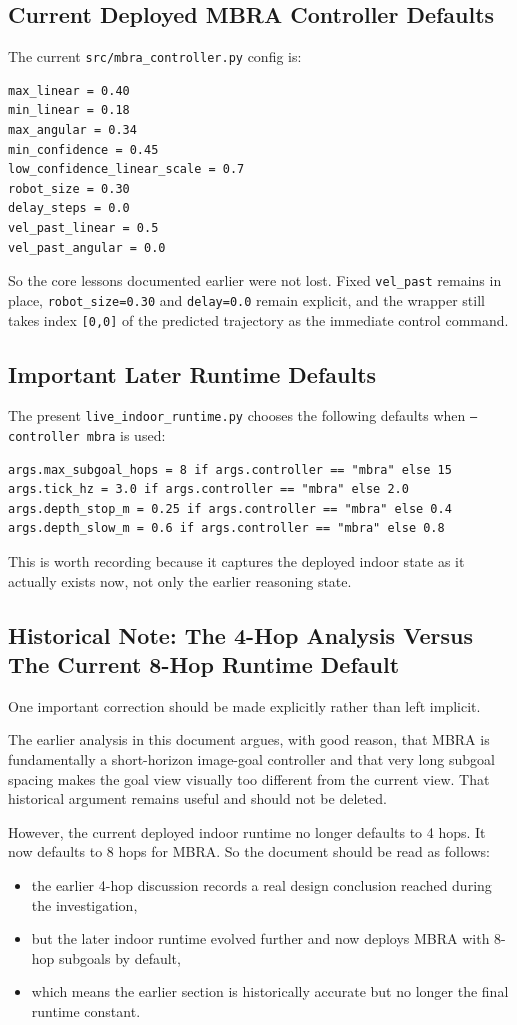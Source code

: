 \documentclass[11pt,a4paper]{article}
\begin{document}
\subsection{Current Deployed MBRA Controller Defaults}
The current \texttt{src/mbra\_controller.py} config is:
\begin{verbatim}
max_linear = 0.40
min_linear = 0.18
max_angular = 0.34
min_confidence = 0.45
low_confidence_linear_scale = 0.7
robot_size = 0.30
delay_steps = 0.0
vel_past_linear = 0.5
vel_past_angular = 0.0
\end{verbatim}

So the core lessons documented earlier were not lost. Fixed \texttt{vel\_past} remains in place, \texttt{robot\_size=0.30} and \texttt{delay=0.0} remain explicit, and the wrapper still takes index \texttt{[0,0]} of the predicted trajectory as the immediate control command.

\subsection{Important Later Runtime Defaults}
The present \texttt{live\_indoor\_runtime.py} chooses the following defaults when \texttt{--controller mbra} is used:
\begin{verbatim}
args.max_subgoal_hops = 8 if args.controller == "mbra" else 15
args.tick_hz = 3.0 if args.controller == "mbra" else 2.0
args.depth_stop_m = 0.25 if args.controller == "mbra" else 0.4
args.depth_slow_m = 0.6 if args.controller == "mbra" else 0.8
\end{verbatim}

This is worth recording because it captures the deployed indoor state as it actually exists now, not only the earlier reasoning state.

\subsection{Historical Note: The 4-Hop Analysis Versus The Current 8-Hop Runtime Default}
One important correction should be made explicitly rather than left implicit.

The earlier analysis in this document argues, with good reason, that MBRA is fundamentally a short-horizon image-goal controller and that very long subgoal spacing makes the goal view visually too different from the current view. That historical argument remains useful and should not be deleted.

However, the current deployed indoor runtime no longer defaults to 4 hops. It now defaults to 8 hops for MBRA. So the document should be read as follows:
\begin{itemize}[leftmargin=*]
\item the earlier 4-hop discussion records a real design conclusion reached during the investigation,
\item but the later indoor runtime evolved further and now deploys MBRA with 8-hop subgoals by default,
\item which means the earlier section is historically accurate but no longer the final runtime constant.
\end{itemize}
\end{document}

